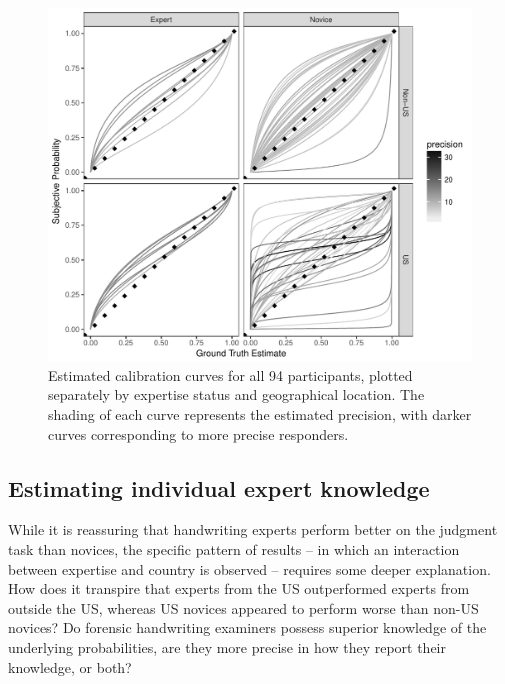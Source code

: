 \documentclass[doc]{apa6} %
\begin{document}
\begin{figure}[t]
\begin{center}
\includegraphics[scale=.7]{calibrationcurves.pdf}
\vspace*{6pt}
\caption{Estimated calibration curves for all 94 participants, plotted separately by expertise status and geographical location. The shading of each curve represents the estimated precision, with darker curves corresponding to more precise responders.}
\label{calibrationcurves}
\end{center}
\end{figure}


\subsection{Estimating individual expert knowledge}

While it is reassuring that handwriting experts perform better on the judgment task than novices, the specific pattern of results -- in which an interaction between expertise and country is observed -- requires some deeper explanation. How does it transpire that experts from the US outperformed experts from outside the US, whereas US novices appeared to perform worse than non-US novices? Do forensic handwriting examiners possess superior knowledge of the underlying probabilities, are they more precise in how they report their knowledge, or both?
\end{document}
